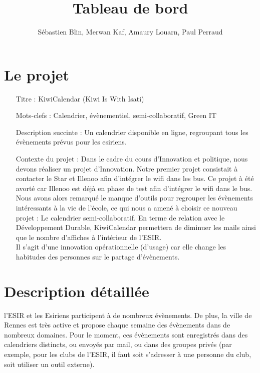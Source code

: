 \documentclass[a4paper,10pt]{article}
\title{Tableau de bord \no 3}
\author{S\'ebastien Blin, Merwan Kaf, Amaury Louarn, Paul Perraud}
\begin{document}
\maketitle

\section{Le projet}
\begin{enumerate}
  \item[Titre :] KiwiCalendar (Kiwi Is With Isati)
  \item[Mots-clefs :] Calendrier, évènementiel, semi-collaboratif, Green IT
  \item[Description succinte :] Un calendrier disponible en ligne, regroupant tous les évènements prévus pour les esiriens.
  \item[Contexte du projet :] Dans le cadre du cours d'Innovation et politique, nous devons réaliser un projet d'Innovation. Notre premier projet consistait à contacter le Star et Illenoo afin d'intégrer le wifi dans les bus. Ce projet à été avorté car Illenoo est d\'ej\`a en phase de test afin d'intégrer le wifi dans le bus. Nous avons alors remarqué le manque d'outils pour regrouper les évènements intéressants à la vie de l'école, ce qui nous a amené à choisir ce nouveau projet : Le calendrier semi-collaboratif. En terme de relation avec le Développement Durable, KiwiCalendar permettera de diminuer les mails ainsi que le nombre d'affiches à l'intérieur de l'ESIR.\\
Il s'agit d'une innovation opérationnelle (d'usage) car elle change les habitudes des personnes sur le partage d'évènements.
\end{enumerate}

\section{Description d\'etaill\'ee}
l'ESIR et les Esiriens participent à de nombreux évènements. De plus, la ville de Rennes est très active et propose chaque semaine des évènements dans de nombreux domaines. Pour le moment, ces évènements sont enregistrés dans des calendriers distincts, ou envoyés par mail, ou dans des groupes privés (par exemple, pour les clubs de l'ESIR, il faut soit s'adresser à une personne du club, soit utiliser un outil externe).
\end{document}
